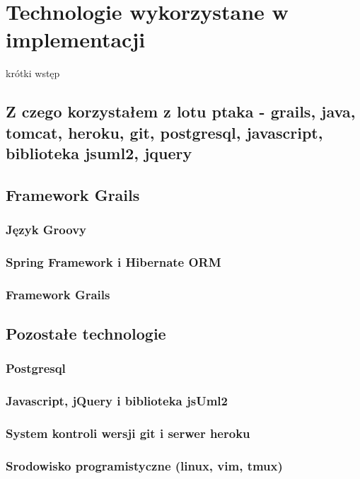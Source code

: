 \chapter{Technologie wykorzystane w implementacji}
  
  krótki wstęp

  \section{Z czego korzystałem z lotu ptaka - grails, java, tomcat, heroku, git, postgresql, javascript, biblioteka jsuml2, jquery}
  \section{Framework Grails}
    \subsection{Język Groovy}
    \subsection{Spring Framework i Hibernate ORM}
    \subsection{Framework Grails}
  \section{Pozostałe technologie}
    \subsection{Postgresql}
    \subsection{Javascript, jQuery i biblioteka jsUml2}
    \subsection{System kontroli wersji git i serwer heroku}
    \subsection{Srodowisko programistyczne (linux, vim, tmux)}
